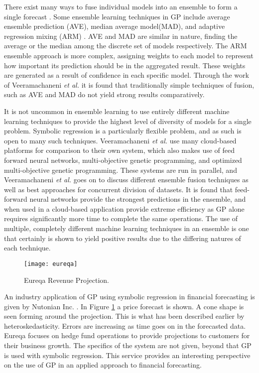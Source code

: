 \documentclass[12pt, letterpaper]{article}
\begin{document}
\textrm{\indent There exist many ways to fuse individual models into an ensemble to form a single forecast \cite{ensemble1}. Some ensemble learning techniques in GP include average ensemble prediction (AVE), median average model(MAD), and adaptive regression mixing (ARM) \cite{ensemble1}. AVE and MAD are similar in nature, finding the average or the median among the discrete set of models respectively. The ARM ensemble approach is more complex, assigning weights to each model to represent how important its prediction should be in the aggregated result. These weights are generated as a result of confidence in each specific model. Through the work of Veeramachaneni \textit{et al.} \cite{ensemble1} it is found that traditionally simple techniques of fusion, such as AVE and MAD do not yield strong results comparatively. }

\textrm{\indent It is not uncommon in ensemble learning to use entirely different machine learning techniques to provide the highest level of diversity of models for a single problem. Symbolic regression is a particularly flexible problem, and as such is open to many such techniques. Veeramachaneni \textit{et al.} \cite{ensemble2} use many cloud-based platforms for comparison to their own system, which also makes use of feed forward neural networks, multi-objective genetic programming, and optimized multi-objective genetic programming. These systems are run in parallel, and Veeramachaneni \textit{et al.} goes on to discuss different ensemble fusion techniques as well as best approaches for concurrent division of datasets. It is found that feed-forward neural networks provide the strongest predictions in the ensemble, and when used in a cloud-based application provide extreme efficiency as GP alone requires significantly more time to complete the same operations. The use of multiple, completely different machine learning techniques in an ensemble is one that certainly is shown to yield positive results due to the differing natures of each technique. }

\begin{figure}[!htbp]
\begin{center}
\texttt{[image: eureqa]}
\end{center}
\caption{Eureqa Revenue Projection.}
\label{eureqa}
\end{figure}

\textrm{ \indent An industry application of GP using symbolic regression in financial forecasting is given by Nutonian Inc. \cite{eureqa}. In Figure \ref{eureqa} a price forecast is shown. A cone shape is seen forming around the projection. This is what has been described earlier by heteroskedasticity. Errors are increasing as time goes on in the forecasted data. Eureqa focuses on hedge fund operations to provide projections to customers for their business growth. The specifics of the system are not given, beyond that GP is used with symbolic regression. This service provides an interesting perspective on the use of GP in an applied approach to financial forecasting. }
\end{document}
